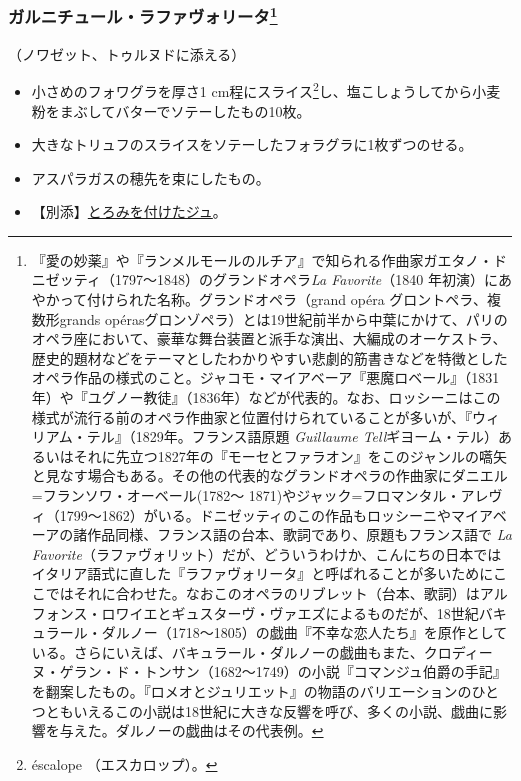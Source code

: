 \begin{recette}
{\subsubsection[ガルニチュール・ラファヴォリータ]{\texorpdfstring{ガルニチュール・ラファヴォリータ\footnote{『愛の妙薬』や『ランメルモールのルチア』で知られる作曲家ガエタノ・ドニゼッティ（1797〜1848）のグランドオペラ\emph{La
  Favorite}（1840
  年初演）にあやかって付けられた名称。グランドオペラ（grand opéra
  グロントペラ、複数形grands
  opérasグロンゾペラ）とは19世紀前半から中葉にかけて、パリのオペラ座において、豪華な舞台装置と派手な演出、大編成のオーケストラ、歴史的題材などをテーマとしたわかりやすい悲劇的筋書きなどを特徴としたオペラ作品の様式のこと。ジャコモ・マイアベーア『悪魔ロベール』（1831年）や『ユグノー教徒』（1836年）などが代表的。なお、ロッシーニはこの様式が流行る前のオペラ作曲家と位置付けられていることが多いが、『ウィリアム・テル』（1829年。フランス語原題
  \emph{Guillaume
  Tell}ギヨーム・テル）あるいはそれに先立つ1827年の『モーセとファラオン』をこのジャンルの嚆矢と見なす場合もある。その他の代表的なグランドオペラの作曲家にダニエル=フランソワ・オーベール(1782〜
  1871)やジャック=フロマンタル・アレヴィ（1799〜1862）がいる。ドニゼッティのこの作品もロッシーニやマイアベーアの諸作品同様、フランス語の台本、歌詞であり、原題もフランス語で
  \emph{La
  Favorite}（ラファヴォリット）だが、どういうわけか、こんにちの日本ではイタリア語式に直した『ラファヴォリータ』と呼ばれることが多いためにここではそれに合わせた。なおこのオペラのリブレット（台本、歌詞）はアルフォンス・ロワイエとギュスターヴ・ヴァエズによるものだが、18世紀バキュラール・ダルノー（1718〜1805）の戯曲『不幸な恋人たち』を原作としている。さらにいえば、バキュラール・ダルノーの戯曲もまた、クロディーヌ・ゲラン・ド・トンサン（1682〜1749）の小説『コマンジュ伯爵の手記』を翻案したもの。『ロメオとジュリエット』の物語のバリエーションのひとつともいえるこの小説は18世紀に大きな反響を呼び、多くの小説、戯曲に影響を与えた。ダルノーの戯曲はその代表例。}}{ガルニチュール・ラファヴォリータ}}\label{garniture-a-la-favorite}}



（ノワゼット、トゥルヌドに添える）

\begin{itemize}
\item
  小さめのフォワグラを厚さ1 cm程にスライス\footnote{éscalope
    （エスカロップ）。}し、塩こしょうしてから小麦粉をまぶしてバターでソテーしたもの10枚。
\item
  大きなトリュフのスライスをソテーしたフォラグラに1枚ずつのせる。
\item
  アスパラガスの穂先を束にしたもの。
\item
  【別添】\protect\hyperlink{jus-de-veau-lie}{とろみを付けたジュ}。
\end{itemize}


\end{recette}
